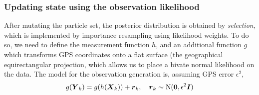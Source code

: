 \subsubsection{Updating state using the observation likelihood}
\label{sec:pf_update}

After mutating the particle set, the posterior distribution is obtained by
\emph{selection}, which is implemented by importance resampling using
likelihood weights.
To do so, we need to define the measurement function $h$,
and an additional function $g$ which transforms GPS coordinates onto a flat
surface (the geographical equirectangular projection,
which allows us to place a bivate normal likelihood on the data.
The model for the observation generation is,
assuming GPS error $\epsilon^2$,
\begin{equation}
\label{eq:pf_obs_model}
g(\mbox{$\boldsymbol{Y}$}_k) = g(h(\mbox{$\boldsymbol{X}$}_k)) + \boldsymbol{r}_k,
\quad \boldsymbol{r}_k \sim \mathrm{N}(\boldsymbol{0}, \epsilon^2\boldsymbol{I})
\end{equation}





